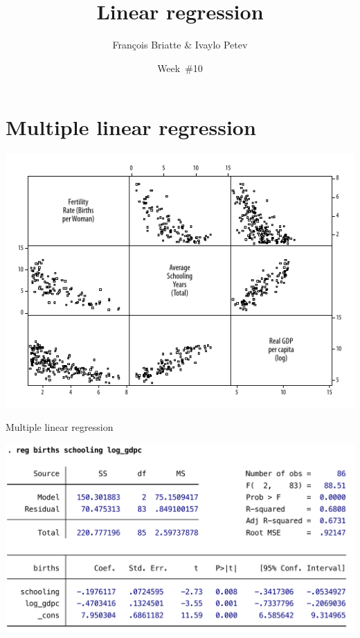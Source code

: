 \documentclass[t]{beamer}
\title{Linear regression}
\author{François Briatte \& Ivaylo Petev}
\date{Week~\#10}
\begin{document}
    

    \frame[plain]{
        \titlepage\\[7em]
        \tableofcontents[hideallsubsections]
        }

    

    \section{Multiple linear regression}

	\begin{frame}[c]%
			
		\begin{center}
			\includegraphics[width=\textwidth]{mreg-gr-mat.pdf}
		\end{center}
				
	\end{frame}
	
	\begin{frame}[c]{Multiple linear regression} %
			
		\begin{center}
			\includegraphics[width=\textwidth]{mreg-output.pdf}
		\end{center}
				
	\end{frame}	
	
\end{document}
